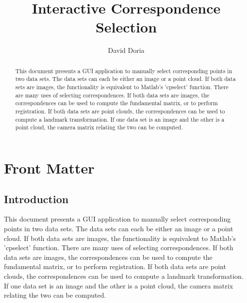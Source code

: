 \documentclass{InsightArticle}
\title{Interactive Correspondence Selection}
\author{David Doria}
\newcommand{\IJhandlerIDnumber}{3313}
\begin{document}
\IJhandlefooter{\IJhandlerIDnumber}


\ifpdf
\else
\fi


\maketitle


\ifhtml
\chapter*{Front Matter\label{front}}
\fi

\begin{abstract}
\noindent
This document presents a GUI application to manually select corresponding points in two data sets. The data sets can each be either an image or a point cloud. If both data sets are images, the functionality is equivalent to Matlab's 'cpselect' function. There are many uses of selecting correspondences. If both data sets are images, the correspondences can be used to compute the fundamental matrix, or to perform registration. If both data sets are point clouds, the correspondences can be used to compute a landmark transformation. If one data set is an image and the other is a point cloud, the camera matrix relating the two can be computed.

\end{abstract}

\IJhandlenote{\IJhandlerIDnumber}

\tableofcontents
\section{Introduction}
This document presents a GUI application to manually select corresponding points in two data sets. The data sets can each be either an image or a point cloud. If both data sets are images, the functionality is equivalent to Matlab's 'cpselect' function. There are many uses of selecting correspondences. If both data sets are images, the correspondences can be used to compute the fundamental matrix, or to perform registration. If both data sets are point clouds, the correspondences can be used to compute a landmark transformation. If one data set is an image and the other is a point cloud, the camera matrix relating the two can be computed.
\end{document}

